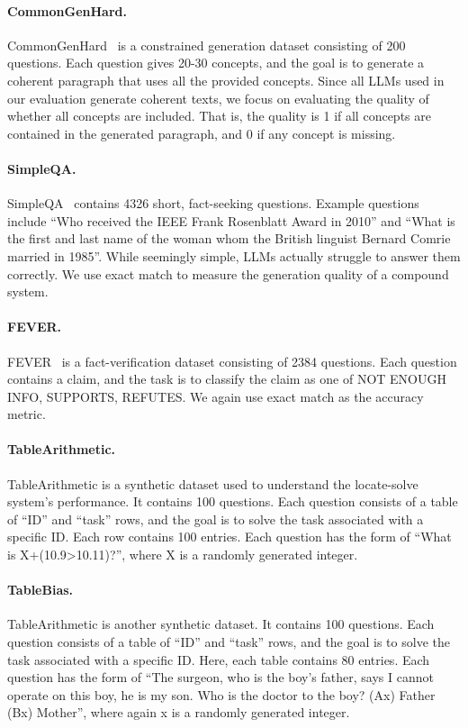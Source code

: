 \paragraph{CommonGenHard.} CommonGenHard~\cite{madaan2024self} is a constrained generation dataset consisting of 200 questions. Each question gives 20-30 concepts, and the goal is to generate a coherent paragraph that uses all the provided concepts. Since all LLMs used in our evaluation generate coherent texts, we focus on evaluating the quality of whether all concepts are included. That is, the quality is 1 if all concepts are contained in the generated paragraph, and 0 if any concept is missing. 

\paragraph{SimpleQA.} SimpleQA~\cite{wei2024measuring} contains 4326 short, fact-seeking questions. Example questions include ``Who received the IEEE Frank Rosenblatt Award in 2010'' and ``What is the first and last name of the woman whom the British linguist Bernard Comrie married in 1985''. While seemingly simple, LLMs actually struggle to answer them correctly. We use exact match to measure the generation quality of a compound system.

\paragraph{FEVER.} FEVER~\cite{Thorne19FEVER2} is a fact-verification dataset consisting of 2384 questions. Each question contains a claim, and the task is to classify the claim as one of NOT ENOUGH INFO, SUPPORTS, REFUTES. We again use exact match as the accuracy metric.



\paragraph{TableArithmetic.} TableArithmetic is a synthetic dataset used to understand the locate-solve system's performance. It contains 100 questions. Each question consists of a table of ``ID'' and ``task'' rows, and the goal is to solve the task associated with a specific ID. Each row contains 100 entries. Each question has the form of ``What is X+(10.9>10.11)?'', where X is a randomly generated integer.

\paragraph{TableBias.} TableArithmetic is another synthetic dataset. It contains 100 questions. Each question consists of a table of ``ID'' and ``task'' rows, and the goal is to solve the task associated with a specific ID. Here, each table contains 80 entries. Each question has the form of ``The surgeon, who is the boy's father, says I cannot operate on this boy, he is my son. Who is the doctor to the boy? (Ax) Father (Bx) Mother'', where again x is a randomly generated integer.

